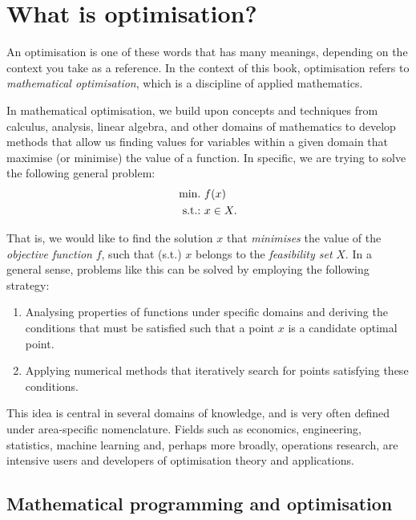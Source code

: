 \section{What is optimisation?}

An optimisation is one of these words that has many meanings, depending on the context you take as a reference. In the context of this book, optimisation refers to \emph{mathematical optimisation}, which is a discipline of applied mathematics.

In mathematical optimisation, we build upon concepts and techniques from calculus, analysis, linear algebra, and other domains of mathematics to develop methods that allow us finding values for variables within a given domain that maximise (or minimise) the value of a function. In specific, we are trying to solve the following general problem:
%
\begin{align}
    \mathop{\text{min.~}} & f(x) \label{p1c1:eq:opt_prob} \\
    \mathop{\text{s.t.:~}}   & x \in X. \nonumber
\end{align}
%

That is, we would like to find the solution $x$ that \emph{minimises} the value of the \emph{objective function} $f$, such that (s.t.) $x$ belongs to the \emph{feasibility set} $X$. In a general sense, problems like this can be solved by employing the following strategy:
%
\begin{enumerate}
    \item Analysing properties of functions under specific domains and deriving the conditions that must be satisfied such that a point $x$ is a candidate optimal point.
    \item Applying numerical methods that iteratively search for points satisfying these conditions. 
\end{enumerate}
%
This idea is central in several domains of knowledge, and is very often defined under area-specific nomenclature. Fields such as economics, engineering, statistics, machine learning and, perhaps more broadly, operations research, are intensive users and developers of optimisation theory and applications. 

\subsection{Mathematical programming and optimisation}

